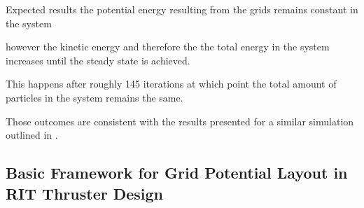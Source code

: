 Expected results the potential energy resulting from the grids remains constant in the system

however the kinetic energy and therefore the the total energy in the system increases until the steady state is achieved.

This happens after roughly 145 iterations at which point the total amount of particles in the system remains the same.

Those outcomes are consistent with the results presented for a similar simulation outlined in \cite{brieda_plasma_2019}.

\subsection{Basic Framework for Grid Potential Layout in RIT Thruster Design}